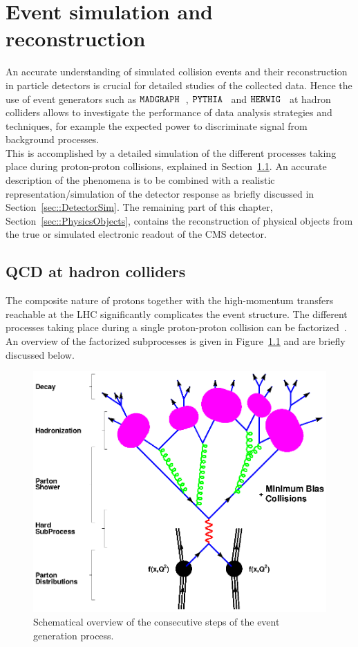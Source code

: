 \chapter{Event simulation and reconstruction} \label{chp:labelTitle}

An accurate understanding of simulated collision events and their reconstruction in particle detectors is crucial for detailed studies of the collected data. Hence the use of event generators such as $\texttt{MADGRAPH}$~\cite{TestRef}, $\texttt{PYTHIA}$~\cite{} and $\texttt{HERWIG}$~\cite{} at hadron colliders allows to investigate the performance of data analysis strategies and techniques, for example the expected power to discriminate signal from background processes.
\\
This is accomplished by a detailed simulation of the different processes taking place during proton-proton collisions, explained in Section~\ref{sec::QCDHadron}. An accurate description of the phenomena is to be combined with a realistic representation/simulation of the detector response as briefly discussed in Section~\ref{sec::DetectorSim}. The remaining part of this chapter, Section~\ref{sec::PhysicsObjects}, contains the reconstruction of physical objects from the true or simulated electronic readout of the CMS detector.

\section{QCD at hadron colliders} \label{sec::QCDHadron}

The composite nature of protons together with the high-momentum transfers reachable at the LHC significantly complicates the event structure. 
The different processes taking place during a single proton-proton collision can be factorized~\cite{}.
An overview of the factorized subprocesses is given in Figure~\ref{fig::EvtShower} and are briefly discussed below.

\begin{figure}[htb]
 \centering
 \includegraphics[width = 0.8 \textwidth]{Chapters/Chapter3/Figures/f_shg_event.eps}
 \caption{Schematical overview of the consecutive steps of the event generation process.}  
 \label{fig::EvtShower}
\end{figure}

